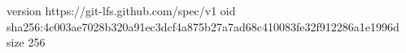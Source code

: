 version https://git-lfs.github.com/spec/v1
oid sha256:4c003ae7028b320a91ec3dcf4a875b27a7ad68c410083fe32f912286a1e1996d
size 256

